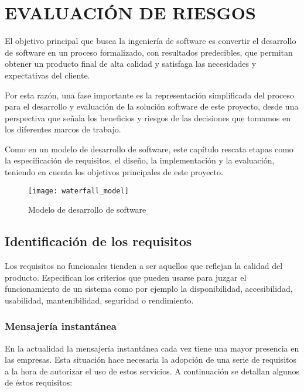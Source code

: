 \chapter{EVALUACIÓN DE RIESGOS\label{sec:disenho}}

\clearpage

El objetivo principal que busca la ingeniería de software es convertir el desarrollo de software en un proceso formalizado, con resultados predecibles, que permitan obtener un producto final de alta calidad y satisfaga las necesidades y expectativas del cliente.

Por esta razón, una fase importante es la representación simplificada del proceso para el desarrollo y evaluación de la solución software de este proyecto, desde una perspectiva que señala los beneficios y riesgos de las decisiones que tomamos en los diferentes marcos de trabajo.

Como en un modelo de desarrollo de software, este capítulo rescata etapas como la especificación de requisitos, el diseño, la implementación y la evaluación, teniendo en cuenta los objetivos principales de este proyecto.

\begin{figure}[htp!]
  \centering
  \texttt{[image: waterfall\_model]}
  \caption{Modelo de desarrollo de software}
  \label{fig:waterfall_model}
\end{figure}

\section{Identificación de los requisitos}

Los requisitos no funcionales tienden a ser aquellos que reflejan la calidad del producto. Especifican los criterios que pueden usarse para juzgar el funcionamiento de un sistema como por ejemplo la disponibilidad, accesibilidad, usabilidad, mantenibilidad, seguridad o rendimiento.

\subsection{Mensajería instantánea}

En la actualidad la mensajería instantánea cada vez tiene una mayor presencia en las empresas. Esta situación hace necesaria la adopción de una serie de requisitos a la hora de autorizar el uso de estos servicios. A continuación se detallan algunos de éstos requisitos:

